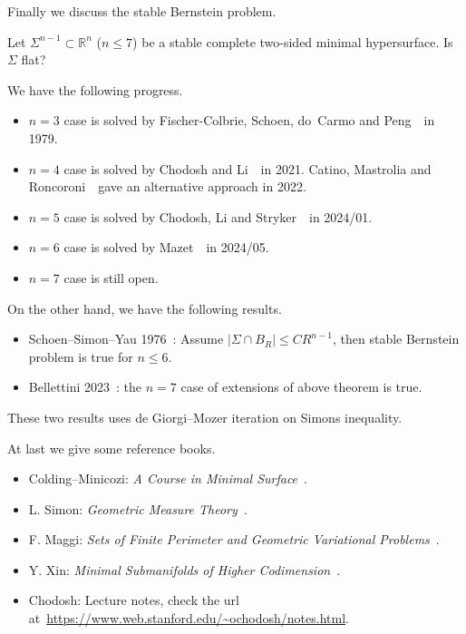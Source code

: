 Finally we discuss the stable Bernstein problem.
\begin{pro}
    Let $\Sigma^{n-1}\subset\mathbb{R}^n$ ($n\leq 7$) be a stable complete two-sided minimal hypersurface.
    Is $\Sigma$ flat?
\end{pro}

We have the following progress.
\begin{itemize}
    \item $n=3$ case is solved by Fischer-Colbrie, Schoen, do~Carmo and Peng~\cite{doCarmo-Peng}~in 1979.
    \item $n=4$ case is solved by Chodosh and Li~\cite{Chodosh-Li1}~in 2021.
    Catino, Mastrolia and Roncoroni~\cite{Catino}~gave an alternative approach in 2022.
    \item $n=5$ case is solved by Chodosh, Li and Stryker~\cite{Chodosh-Li2}~in 2024/01.
    \item $n=6$ case is solved by Mazet~\cite{Mazet}~in 2024/05.
    \item $n=7$ case is still open.
\end{itemize}

On the other hand, we have the following results.
\begin{itemize}
    \item Schoen--Simon--Yau 1976~\cite{Schoen-Simon-Yau}: Assume $|\Sigma\cap B_R|\leq CR^{n-1}$, then stable Bernstein problem is true for $n\leq 6$.
    \item Bellettini 2023~\cite{Bellettini}: the $n=7$ case of extensions of above theorem is true.
\end{itemize}
These two results uses de Giorgi--Mozer iteration on Simons inequality.

At last we give some reference books.
\begin{itemize}
    \item Colding--Minicozi: \emph{A Course in Minimal Surface}~\cite{Colding-Minicozzi}.
    \item L. Simon: \emph{Geometric Measure Theory}~\cite{Simon}.
    \item F. Maggi: \emph{Sets of Finite Perimeter and Geometric Variational Problems}~\cite{Maggi}.
    \item Y. Xin: \emph{Minimal Submanifolds of Higher Codimension}~\cite{Xin}.
    \item Chodosh: Lecture notes, check the url at~\url{https://www.web.stanford.edu/~ochodosh/notes.html}.
\end{itemize}